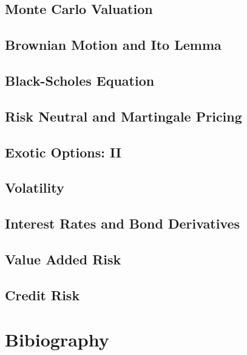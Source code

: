 \documentclass{book}
\theoremstyle{definition}
\theoremstyle{remark}
\begin{document}
\section{Monte Carlo Valuation}
\section{Brownian Motion and Ito Lemma}
\section{Black-Scholes Equation}
\section{Risk Neutral and Martingale Pricing}
\section{Exotic Options: II}
\section{Volatility}
\section{Interest Rates and Bond Derivatives}
\section{Value Added Risk}
\section{Credit Risk}



\newpage
\chapter{Bibiography}
\printbibliography
\end{document}
